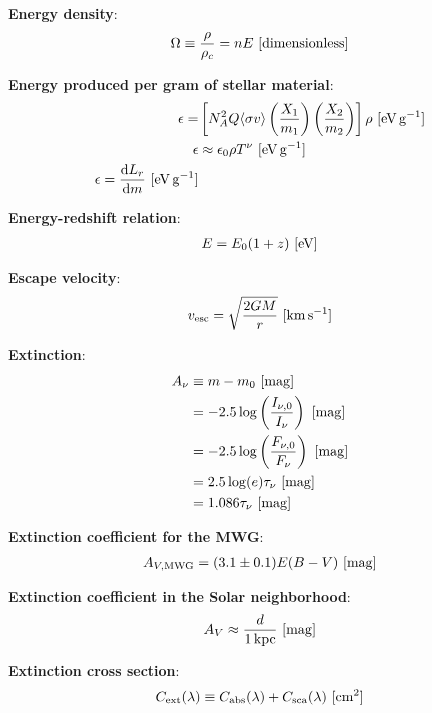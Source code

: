 \documentclass[a4paper,10pt]{article}
\begin{document}
{\noindent}\textbf{Energy density}:
\begin{align*}
    \Omega \equiv \dfrac{\rho}{\rho_c} = nE ~ [{\rm dimensionless}]
\end{align*}

{\noindent}\textbf{Energy produced per gram of stellar material}:
\begin{align*}
    \epsilon = &\left[ N_A^2Q \langle\sigma v\rangle \left(\frac{X_1}{m_1}\right) \left(\frac{X_2}{m_2}\right) \right] \rho ~ [{\rm eV\,g^{-1}}] \\
    \epsilon &\approx \epsilon_0\rho T^\nu ~ [{\rm eV\,g^{-1}}] \\
    \epsilon = \frac{{\rm d}L_r}{{\rm d}m} ~ [{\rm eV\,g^{-1}}]
\end{align*}

{\noindent}\textbf{Energy-redshift relation}:
\begin{align*}
    E = E_0(1+z) ~ [{\rm eV}]
\end{align*}

{\noindent}\textbf{Escape velocity}:
\begin{align*}
    v_\mathrm{esc} = \sqrt{\frac{2GM}{r}} ~ [{\rm km\,s^{-1}}]
\end{align*}

{\noindent}\textbf{Extinction}:
\begin{align*}
    A_\nu &\equiv m-m_0 ~ [{\rm mag}] \\
          & = -2.5\log\left(\frac{I_{\nu,0}}{I_\nu}\right) ~ [{\rm mag}] \\
          & = -2.5\log\left(\frac{F_{\nu,0}}{F_\nu}\right) ~ [{\rm mag}] \\
          &= 2.5\log(e)\tau_\nu ~ [{\rm mag}] \\
          &= 1.086\tau_\nu ~ [{\rm mag}]
\end{align*}

{\noindent}\textbf{Extinction coefficient for the MWG}:
\begin{align*}
    A_{V,\mathrm{MWG}} = (3.1\pm0.1)E(B-V) ~ [{\rm mag}]
\end{align*}

{\noindent}\textbf{Extinction coefficient in the Solar neighborhood}:
\begin{align*}
    A_V \approx \frac{d}{1\,{\rm kpc}} ~ [{\rm mag}]
\end{align*}

{\noindent}\textbf{Extinction cross section}:
\begin{align*}
    C_{\rm ext}(\lambda) \equiv C_{\rm abs}(\lambda)+C_{\rm sca}(\lambda) ~ [{\rm cm^2}]
\end{align*}
\end{document}
